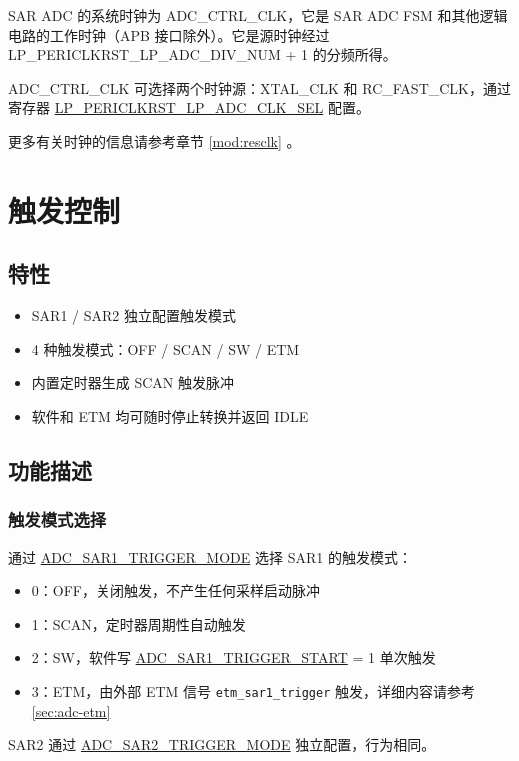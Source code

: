 \documentclass[main\_\_CN.tex]{subfiles}
\begin{document}
SAR ADC 的系统时钟为 ADC\_CTRL\_CLK，它是 SAR ADC FSM 和其他逻辑电路的工作时钟（APB 接口除外）。它是源时钟经过 LP\_PERICLKRST\_LP\_ADC\_DIV\_NUM + 1 的分频所得。

ADC\_CTRL\_CLK 可选择两个时钟源：XTAL\_CLK 和 RC\_FAST\_CLK，通过寄存器 \hyperref[fielddesc:LPPERICLKRSTLPADCCLKSEL]{LP\_PERICLKRST\_LP\_ADC\_CLK\_SEL} 配置。

更多有关时钟的信息请参考章节 \ref{mod:resclk} \textit{}。

\section{触发控制}
\label{sec:adc-trigger}

\subsection{特性}
\begin{itemize}
    \item SAR1 / SAR2 独立配置触发模式
    \item 4 种触发模式：OFF / SCAN / SW / ETM
    \item 内置定时器生成 SCAN 触发脉冲
    \item 软件和 ETM 均可随时停止转换并返回 IDLE
\end{itemize}

\subsection{功能描述}
\label{sec:adc-trigger-func-descr}

\subsubsection{触发模式选择}
通过 \hyperref[fielddesc:ADCSAR1TRIGGERMODE]{ADC\_SAR1\_TRIGGER\_MODE} 选择 SAR1 的触发模式：
\begin{itemize}
    \item 0：OFF，关闭触发，不产生任何采样启动脉冲
    \item 1：SCAN，定时器周期性自动触发
    \item 2：SW，软件写 \hyperref[fielddesc:ADCSAR1TRIGGERSTART]{ADC\_SAR1\_TRIGGER\_START} = 1 单次触发
    \item 3：ETM，由外部 ETM 信号 \verb+etm_sar1_trigger+ 触发，详细内容请参考 \ref{sec:adc-etm} \textit{}
\end{itemize}
SAR2 通过 \hyperref[fielddesc:ADCSAR2TRIGGERMODE]{ADC\_SAR2\_TRIGGER\_MODE} 独立配置，行为相同。
\end{document}
